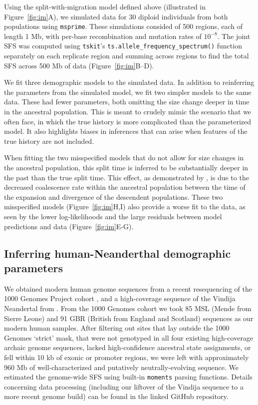 \documentclass[]{article}
\newcommand{\moments}{\texttt{moments}\xspace}
\newcommand{\msprime}{\texttt{msprime}\xspace}
\newcommand{\tskit}{\texttt{tskit}\xspace}
\begin{document}
Using the split-with-migration model defined above (illustrated in
Figure~\ref{fig:im}A), we simulated data for 30 diploid individuals from both
populations using \msprime \citep{baumdicker2022efficient}. These simulations
consided of 500 regions, each of length 1 Mb, with per-base recombination and
mutation rates of $10^{-8}$. The joint SFS was computed using \tskit's
\texttt{ts.allele\_frequency\_spectrum()} function separately on each replicate
region and summing across regions to find the total SFS across 500 Mb of data
(Figure~\ref{fig:im}B--D).

We fit three demographic models to the simulated data. In addition to
reinferring the parameters from the simulated model, we fit two simpler models
to the same data. These had fewer parameters, both omitting the size change
deeper in time in the ancestral population. This is meant to crudely mimic the
scenario that we often face, in which the true history is more complicated than
the parameterized model. It also highlights biases in inferences that can arise
when features of the true history are not included.

When fitting the two misspecified models that do not allow for size changes in
the ancestral population, this split time is inferred to be substantially
deeper in the past than the true split time. This effect, as demonstrated by
\citet{momigliano2020biases}, is due to the decreased coalescence rate within
the ancestral population between the time of the expansion and divergence of
the descendent populations. These two misspecified models
(Figure~\ref{fig:im}H,I) also provide a worse fit to the data, as seen by the
lower log-likelihoods and the large residuals between model predictions and
data (Figure~\ref{fig:im}E-G).

\subsection*{Inferring human-Neanderthal demographic parameters}

We obtained modern human genome sequences from a recent resequencing of the 1000 Genomes Project cohort \citep{byrska2022high}, and a high-coverage sequence of the Vindija Neandertal from \cite{prufer2017high}. 
From the 1000 Genomes cohort we took 85 MSL (Mende from Sierre Leone) and 91 GBR (British from England and Scotland) sequences as our modern human samples.  
After filtering out sites that lay outside the 1000 Genomes `strict' mask, that were not genotyped in all four existing high-coverage archaic genome sequences, lacked high-confidence ancestral state assignments, or fell within 10 kb of exonic or promoter regions, we were left with approximately 960 Mb of well-characterized and putatively neutrally-evolving sequence.
We estimated the genome-wide SFS using built-in \moments parsing functions.
Details concerning data processing (including our liftover of the Vindija sequence to a more recent genome build) can be found in the linked GitHub repository.
\end{document}
